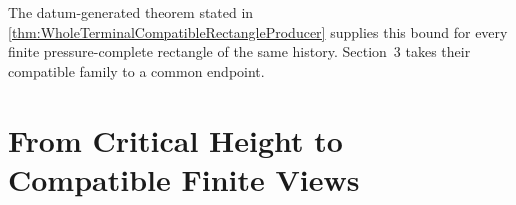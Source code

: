 The datum-generated theorem stated in \cref{thm:WholeTerminalCompatibleRectangleProducer} supplies this bound for every finite pressure-complete rectangle of the same history.
Section~3 takes their compatible family to a common endpoint.


\section{From Critical Height to Compatible Finite Views}\label{sec:FromCriticalHeightToCompatibleFiniteViews}











